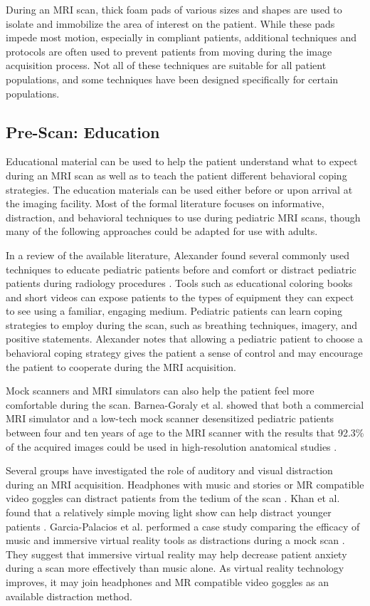 During an MRI scan, thick foam pads of various sizes and shapes are used to isolate and immobilize the area of interest on the patient. While these pads impede most motion, especially in compliant patients, additional techniques and protocols are often used to prevent patients from moving during the image acquisition process. Not all of these techniques are suitable for all patient populations, and some techniques have been designed specifically for certain populations.

\subsection{Pre-Scan: Education}

Educational material can be used to help the patient understand what to expect during an MRI scan as well as to teach the patient different behavioral coping strategies. The education materials can be used either before or upon arrival at the imaging facility. Most of the formal literature focuses on informative, distraction, and behavioral techniques to use during pediatric MRI scans, though many of the following approaches could be adapted for use with adults.

In a review of the available literature, Alexander found several commonly used techniques to educate pediatric patients before and comfort or distract pediatric patients during radiology procedures \cite{Alexander2012}. Tools such as educational coloring books and short videos can expose patients to the types of equipment they can expect to see using a familiar, engaging medium. Pediatric patients can learn coping strategies to employ during the scan, such as breathing techniques, imagery, and positive statements. Alexander notes that allowing a pediatric patient to choose a behavioral coping strategy gives the patient a sense of control and may encourage the patient to cooperate during the MRI acquisition.

Mock scanners and MRI simulators can also help the patient feel more comfortable during the scan. Barnea-Goraly et al. showed that both a commercial MRI simulator and a low-tech mock scanner desensitized pediatric patients between four and ten years of age to the MRI scanner with the results that 92.3\% of the acquired images could be used in high-resolution anatomical studies \cite{Barnea-Goraly2014}. 

Several groups have investigated the role of auditory and visual distraction during an MRI acquisition. Headphones with music and stories or MR compatible video goggles can distract patients from the tedium of the scan \cite{Alexander2012} \cite{Barnea-Goraly2014} \cite{Harned2001}. Khan et al. found that a relatively simple moving light show can help distract younger patients \cite{Khan2007}. Garcia-Palacios et al. performed a case study comparing the efficacy of music and immersive virtual reality tools as distractions during a mock scan \cite{Garcia-Palacios2007}. They suggest that immersive virtual reality may help decrease patient anxiety during a scan more effectively than music alone. As virtual reality technology improves, it may join headphones and MR compatible video goggles as an available distraction method.


